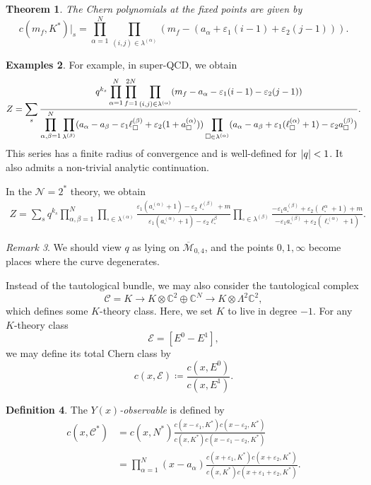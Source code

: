 \documentclass[leqno, openany]{memoir}
\newtheorem{thm}{Theorem}[section]
\theoremstyle{definition}
\newtheorem{defn}[thm]{Definition}
\newtheorem{exms}[thm]{Examples}
\theoremstyle{remark}
\newtheorem{rmk}[thm]{Remark}
\theoremstyle{plain}
\theoremstyle{definition}
\theoremstyle{remark}
\newcommand{\C}{\mathbb{C}}
\newcommand{\ep}{\varepsilon}
\newcommand{\mc}[1]{\mathcal{#1}}
\newcommand{\ol}[1]{\overline{#1}}
\begin{document}
\begin{thm}
    The Chern polynomials at the fixed points are given by
    \[ c(m_f, K^*)|_s = \prod_{\alpha=1}^N \prod_{(i,j) \in \lambda^{(\alpha)}} (m_f - (a_{\alpha} + \ep_1(i-1) + \ep_2(j-1))). \]
\end{thm}

\begin{exms}
For example, in super-QCD, we obtain \begin{align*}
    Z =\sum_s\frac{q^{k_s}\displaystyle \prod_{\alpha=1}^N \prod_{f=1}^{2N} \prod_{(i,j)\in \lambda^{(\alpha)}} (m_f - a_{\alpha} - \ep_1(i-1) - \ep_2(j-1))}{\displaystyle\prod_{\alpha,\beta=1}^N \prod_{\box \in \lambda^{(\beta)}}(a_{\alpha}-a_{\beta} - \ep_1 \ell_{\square}^{(\beta)}+ \ep_2 (1+a_{\square}^{(\alpha)})) \prod_{\square \in \lambda^{(\alpha)}} (a_{\alpha}-a_{\beta}+\ep_1 (\ell_{\square}^{(\alpha)}+1) - \ep_2 a_{\square}^{(\beta)})}.
\end{align*}
This series has a finite radius of convergence and is well-defined for $\abs{q} < 1$. It also admits a non-trivial analytic continuation.

In the $\mc{N}=2^*$ theory, we obtain
\begin{align*}
    Z =\sum_s q^{k_s} \prod_{\alpha,\beta=1}^N \prod_{\square \in \lambda^{(\alpha)}} \frac{\ep_1(a_{\square}^{(\alpha)}+1) - \ep_2 \ell_{\square}^{(\beta)}+m}{\ep_1(a_{\square}^{(\alpha)}+1) - \ep_2 \ell_{\square}^{\beta}} \prod_{\square \in \lambda^{(\beta)}} \frac{-\ep_1 a_{\square}^{(\beta)} + \ep_2(\ell_{\square}^{\alpha}+1)+m}{-\ep_1 a_{\square}^{(\beta)} + \ep_2 (\ell_{\square}^{(\alpha)}+1)}.
\end{align*}
\end{exms}

\begin{rmk}
    We should view $q$ as lying on $\ol{\mc{M}}_{0,4}$, and the points $0, 1, \infty$ become places where the curve degenerates.
\end{rmk}

Instead of the tautological bundle, we may also consider the tautological complex
\[ \mc{C} = K \to K \otimes \C^2 \oplus \C^N \to K \otimes \Lambda^2 \C^2, \]
which defines some $K$-theory class. Here, we set $K$ to live in degree $-1$. For any $K$-theory class
\[ \mc{E} = [E^0-E^1], \]
we may define its total Chern class by
\[ c(x, \mc{E}) \coloneqq \frac{c(x, E^0)}{c(x, E^1)}. \]

\begin{defn}
    The \textit{$Y(x)$-observable} is defined by
    \begin{align*}
        c(x, \mc{C}^*) &= c(x, N^*) \frac{c(x-\ep_1, K^*) c(x-\ep_2, K^*)}{c(x, K^*) c(x-\ep_1 - \ep_2, K^*)} \\
        &= \prod_{\alpha=1}^N (x-a_{\alpha})\frac{c(x+\ep_1, K^*) c(x+\ep_2, K^*)}{c(x, K^*) c(x+\ep_1 + \ep_2, K^*)}.
    \end{align*}
\end{defn}
\end{document}
